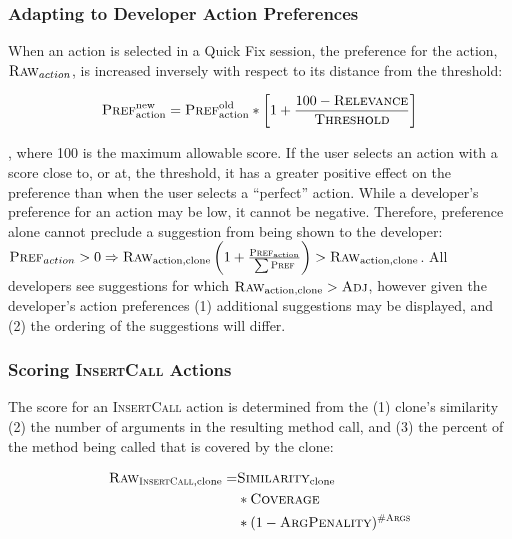 \documentclass[nocopyrightspace,10pt]{sigplanconf}
\begin{document}
\subsubsection{Adapting to Developer Action Preferences}
\label{sec:preference}
When an action is selected in a Quick Fix session, the preference for
the action, $\textsc{Raw}_{action}$, is increased inversely with respect to its
distance from the threshold:

\begin{equation*}
  \textsc{Pref}^{\text{new}}_{\text{action}} = \textsc{Pref}^{\text{old}}_{\text{action}} * \left[ 1 + \frac{100 - \textsc{Relevance}}{\textsc{Threshold}} \right]
\end{equation*}

\noindent, where 100 is the maximum allowable
score. If the user selects an action with a score close to, or at, the
threshold, it has a greater positive effect on the preference than
when the user selects a ``perfect'' action.
While a developer's preference for an action may be low, it cannot be
negative. Therefore, preference alone cannot preclude a suggestion
from being shown to the developer: $\textsc{Pref}_{action} > 0 \Rightarrow
\textsc{Raw}_{\text{action,clone}}\left(1 + \frac{\textsc{Pref}_{\text{action}}}{\sum{\textsc{Pref}}}\right) > \textsc{Raw}_{\text{action,clone}}$.
All developers see suggestions for which $\textsc{Raw}_{\text{action,clone}} > \textsc{Adj}$,
however given the developer's action preferences (1) additional
suggestions may be displayed, and (2) the ordering of the suggestions
will differ.

\subsubsection{Scoring \textsc{InsertCall} Actions}
\label{sec:call}
The score for an \textsc{InsertCall} action is determined
from the (1) clone's similarity (2) the number of arguments in the
resulting method call, and (3) the percent of the method being called
that is covered by the clone:

\begin{align*}
  \textsc{Raw}_{\textsc{InsertCall}, \text{clone}} = & \textsc{Similarity}_{\text{clone}} \\ 
   & * \textsc{Coverage}  \\
   & * (1 - \textsc{ArgPenality})^{\textsc{\#Args}}
\end{align*}
\end{document}
